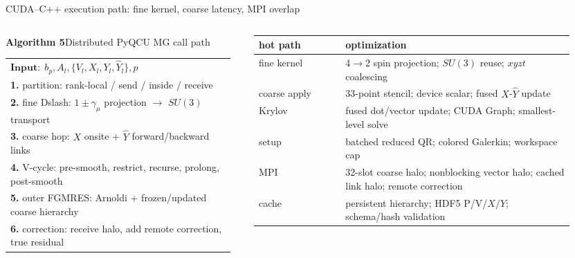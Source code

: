 \documentclass[UTF8,aspectratio=169,11pt,fontset=none]{ctexbeamer}
\begin{document}
\begin{frame}[t,shrink=4]{CUDA--C++ execution path: fine kernel, coarse latency, MPI overlap}
\begin{columns}[T,totalwidth=\textwidth]
\begin{column}{0.55\textwidth}
\begin{center}\textbf{Algorithm 5}\quad Distributed PyQCU MG call path\end{center}
\small
\begin{tabular}{@{}>{\raggedright\arraybackslash}p{0.96\linewidth}@{}}
\toprule
\(\mathbf{Input:}\;b_p,A_l,\{V_l,X_l,Y_l,\widehat Y_l\},p\)\\
\textbf{1.} partition: rank-local / send / inside / receive\\
\textbf{2.} fine Dslash: \(1\pm\gamma_\mu\) projection \(\to\) \(SU(3)\) transport\\
\textbf{3.} coarse hop: \(X\) onsite + \(\widehat Y\) forward/backward links\\
\textbf{4.} V-cycle: pre-smooth, restrict, recurse, prolong, post-smooth\\
\textbf{5.} outer FGMRES: Arnoldi + frozen/updated coarse hierarchy\\
\textbf{6.} correction: receive halo, add remote correction, true residual\\
\bottomrule
\end{tabular}
\end{column}
\begin{column}{0.43\textwidth}
\small
\begin{tabular}{@{}p{0.25\linewidth}p{0.66\linewidth}@{}}
\toprule
hot path & optimization\\
\midrule
fine kernel & 4\(\to\)2 spin projection; \(SU(3)\) reuse; \(xyzt\) coalescing\\
coarse apply & 33-point stencil; device scalar; fused \(X\)-\(\widehat Y\) update\\
Krylov & fused dot/vector update; CUDA Graph; smallest-level solve\\
setup & batched reduced QR; colored Galerkin; workspace cap\\
MPI & 32-slot coarse halo; nonblocking vector halo; cached link halo; remote correction\\
cache & persistent hierarchy; HDF5 P/V/\(X/Y\); schema/hash validation\\
\bottomrule
\end{tabular}
\end{column}
\end{columns}
\end{frame}
\end{document}

